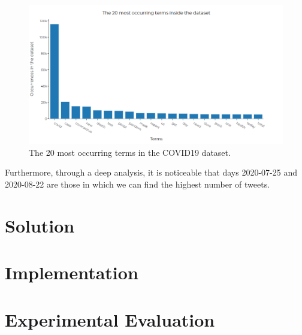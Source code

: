 \begin{figure}[h]
  \centering
  \includegraphics[width=\linewidth]{terms_occurrence.png}
  \caption{The 20 most occurring terms in the COVID19 dataset.}
  \label{fig:termsOccurrence}
\end{figure}

Furthermore, through a deep analysis, it is noticeable that days 2020-07-25 and 2020-08-22 are those in which we can find the highest number of tweets. 

\section{Solution}

\section{Implementation}

\section{Experimental Evaluation}
